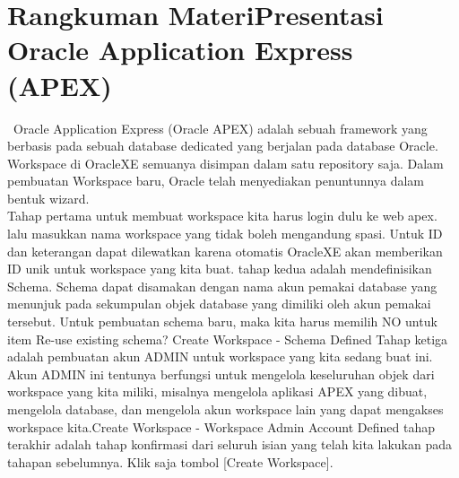 \chapter{Rangkuman MateriPresentasi Oracle Application Express (APEX)}

\	Oracle Application Express (Oracle APEX) adalah sebuah framework yang berbasis pada sebuah database dedicated yang berjalan pada database Oracle. Workspace di OracleXE semuanya disimpan dalam satu repository saja. Dalam pembuatan Workspace baru, Oracle telah menyediakan penuntunnya dalam bentuk wizard.\\

Tahap pertama untuk membuat workspace kita harus login dulu ke web apex. lalu masukkan nama workspace yang tidak boleh mengandung spasi. Untuk ID dan keterangan dapat dilewatkan karena otomatis OracleXE akan memberikan ID unik untuk workspace yang kita buat.
tahap kedua adalah mendefinisikan Schema. Schema dapat disamakan dengan nama akun pemakai database yang menunjuk pada sekumpulan objek database yang dimiliki oleh akun pemakai tersebut. Untuk pembuatan schema baru, maka kita harus memilih NO untuk item Re-use existing schema? Create Workspace - Schema Defined
Tahap ketiga adalah pembuatan akun ADMIN untuk workspace yang kita sedang buat ini. Akun ADMIN ini tentunya berfungsi untuk mengelola keseluruhan objek dari workspace yang kita miliki, misalnya mengelola aplikasi APEX yang dibuat, mengelola database, dan mengelola akun workspace lain yang dapat mengakses workspace kita.Create Workspace - Workspace Admin Account Defined 
tahap terakhir adalah tahap konfirmasi dari seluruh isian yang telah kita lakukan pada tahapan sebelumnya. Klik saja tombol [Create Workspace].\\
